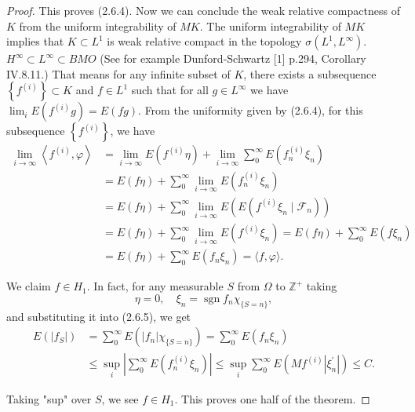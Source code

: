 \documentclass[reqno]{amsart}
\numberwithin{equation}{section}
\begin{document}
\begin{proof}
This proves (2.6.4). Now we can conclude the weak relative compactness of $K$ from the uniform integrability of $M K$. The uniform integrability of $M K$ implies that $K \subset L^1$ is weak relative compact in the topology $\sigma\left(L^1, L^{\infty}\right)$. {\color{blue} $H^\infty \subset L^\infty\subset BMO$} (See for example Dunford-Schwartz [1] p.294, Corollary IV.8.11.) That means for any infinite subset of $K$, there exists a subsequence $\left\{f^{(i)}\right\} \subset K$ and $f \in L^1$ such that for all $g \in L^{\infty}$ we have
$\lim _i E\left(f^{(i)} g\right)=E(f g)$. From the uniformity given by (2.6.4), for this subsequence $\left\{f^{(i)}\right\}$, we have
$$
\begin{aligned}
\lim _{i \rightarrow \infty}\left\langle f^{(i)}, \varphi\right\rangle & =\lim _{i \rightarrow \infty} E\left(f^{(i)} \eta\right)+\lim _{i \rightarrow \infty} \sum_0^{\infty} E\left(f_n^{(i)} \xi_n\right) \\
& =E(f \eta)+\sum_0^{\infty} \lim _{i \rightarrow \infty} E\left(f_n^{(i)} \xi_n\right) \\
& =E(f \eta)+\sum_0^{\infty} \lim _{i \rightarrow \infty} E\left(E\left(f^{(i)} \xi_n \mid \mathcal{F}_n\right)\right) \\
& =E(f \eta)+\sum_0^{\infty} \lim _{i \rightarrow \infty} E\left(f^{(i)} \xi_n\right)=E(f \eta)+\sum_0^{\infty} E\left(f \xi_n\right) \\
& =E(f \eta)+\sum_0^{\infty} E\left(f_n \xi_n\right)=\langle f, \varphi\rangle .
\end{aligned}
$$

We claim $f \in H_1$. In fact, for any measurable $S$ from $\Omega$ to $\mathbb{Z}^{+}$ taking
$$
\eta=0, \quad \xi_n=\operatorname{sgn} f_n \chi_{\{S=n\}},
$$
and substituting it into (2.6.5), we get
$$
\begin{aligned}
E\left(\left|f_S\right|\right) & =\sum_0^{\infty} E\left(\left|f_n\right| \chi_{\{S=n\}}\right)=\sum_0^{\infty} E\left(f_n \xi_n\right) \\
& \leq \sup _i\left|\sum_0^{\infty} E\left(f_n^{(i)} \xi_n\right)\right| \leq \sup _i \sum_0^{\infty} E\left(M f^{(i)}\left|\xi_n^{\prime}\right|\right) \leq C .
\end{aligned}
$$

Taking "sup" over $S$, we see $f \in H_1$. This proves one half of the theorem.



\end{proof}
\end{document}
